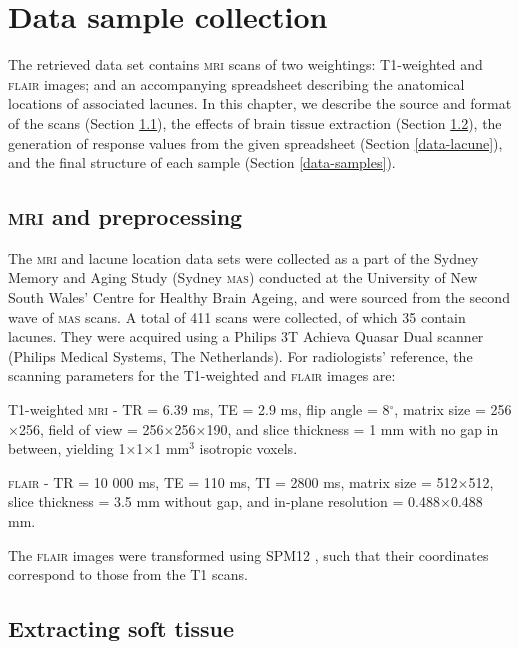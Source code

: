 %
%

\chapter{Data sample collection}\label{data}

The retrieved data set contains \textsc{mri} scans of two weightings: T1-weighted and \textsc{flair} images; and an accompanying spreadsheet describing the anatomical locations of associated lacunes. In this chapter, we describe the source and format of the scans (Section \ref{data-mri}), the effects of brain tissue extraction (Section \ref{data-soft}), the generation of response values from the given spreadsheet (Section \ref{data-lacune}), and the final structure of each sample (Section \ref{data-samples}).

\section{\textsc{mri} and preprocessing}\label{data-mri}

The \textsc{mri} and lacune location data sets were collected as a part of the Sydney Memory and Aging Study (Sydney \textsc{mas}) conducted at the University of New South Wales' Centre for Healthy Brain Ageing, and were sourced from the second wave of \textsc{mas} scans. A total of 411 scans were collected, of which 35 contain lacunes. They were acquired using a Philips 3T Achieva Quasar Dual scanner (Philips Medical Systems, The Netherlands). For radiologists' reference, the scanning parameters for the T1-weighted and \textsc{flair} images are:

T1-weighted \textsc{mri} - TR = 6.39 ms, TE = 2.9 ms, flip angle = 8$^\circ$, matrix size = 256$\times$256, field of view = 256$\times$256$\times$190, and slice thickness = 1 mm with no gap in between, yielding 1$\times$1$\times$1 mm$^3$ isotropic voxels.

\textsc{flair} - TR = 10 000 ms, TE = 110 ms, TI = 2800 ms, matrix size = 512$\times$512, slice thickness = 3.5 mm without gap, and in-plane resolution = 0.488$\times$0.488 mm.

The \textsc{flair} images were transformed using SPM12 \citeyearpar{spm12}, such that their coordinates correspond to those from the T1 scans.

\section{Extracting soft tissue}\label{data-soft}

